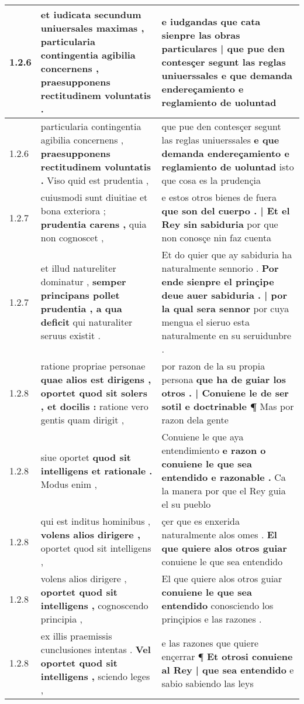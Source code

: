 \begin{tabular}{|p{1cm}|p{6.5cm}|p{6.5cm}|}
1.2.6 & et iudicata secundum uniuersales maximas , \textbf{ particularia contingentia agibilia concernens , } praesupponens rectitudinem voluntatis . & e iudgandas \textbf{ que cata sienpre las obras particulares | que pue den contesçer segunt las reglas uniuerssales } e que demanda endereçamiento e reglamiento de uoluntad \\\hline
1.2.6 & particularia contingentia agibilia concernens , \textbf{ praesupponens rectitudinem voluntatis . } Viso quid est prudentia , & que pue den contesçer segunt las reglas uniuerssales \textbf{ e que demanda endereçamiento e reglamiento de uoluntad } isto que cosa es la prudençia \\\hline
1.2.7 & cuiusmodi sunt diuitiae et bona exteriora ; \textbf{ prudentia carens , } quia non cognoscet , & e estos otros bienes de fuera \textbf{ que son del cuerpo . | Et el Rey sin sabiduria } por que non conosçe nin faz cuenta \\\hline
1.2.7 & et illud natureliter dominatur , \textbf{ semper principans pollet prudentia , a qua deficit } qui naturaliter seruus existit . & Et do quier que ay sabiduria ha naturalmente sennorio . \textbf{ Por ende sienpre el prinçipe deue auer sabiduria . | por la qual sera sennor } por cuya mengua el sieruo esta naturalmente en su seruidunbre . \\\hline
1.2.8 & ratione propriae personae \textbf{ quae alios est dirigens , oportet quod sit solers , et docilis : } ratione vero gentis quam dirigit , & por razon de la su propia persona \textbf{ que ha de guiar los otros . | Conuiene le de ser sotil e doctrinable ¶ } Mas por razon dela gente \\\hline
1.2.8 & siue oportet \textbf{ quod sit intelligens et rationale . } Modus enim , & Conuiene le que aya entendimiento \textbf{ e razon o conuiene le que sea entendido e razonable . } Ca la manera por que el Rey guia el su pueblo \\\hline
1.2.8 & qui est inditus hominibus , \textbf{ volens alios dirigere , } oportet quod sit intelligens , & çer que es enxerida naturalmente alos omes . \textbf{ El que quiere alos otros guiar } conuiene le que sea entendido \\\hline
1.2.8 & volens alios dirigere , \textbf{ oportet quod sit intelligens , } cognoscendo principia , & El que quiere alos otros guiar \textbf{ conuiene le que sea entendido } conosciendo los prinçipios e las razones . \\\hline
1.2.8 & ex illis praemissis cunclusiones intentas . \textbf{ Vel oportet quod sit intelligens , } sciendo leges , & e las razones que quiere ençerrar ¶ \textbf{ Et otrosi conuiene al Rey | que sea entendido } e sabio sabiendo las leys \\\hline

\end{tabular}
